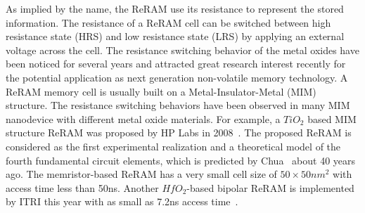 As implied by the name, the ReRAM use its resistance to represent the stored information. The resistance of a ReRAM cell can be switched between high resistance state (HRS) and low resistance state (LRS) by applying an external voltage across the cell. The resistance switching behavior of the metal oxides have been noticed for several years and attracted great research interest recently for the potential application as next generation non-volatile memory technology. A ReRAM memory cell is usually built on a Metal-Insulator-Metal (MIM) structure. The resistance switching behaviors have been observed in many MIM nanodevice with different metal oxide materials. For example, a $TiO_2$ based MIM structure ReRAM was proposed by HP Labs in 2008~\cite{memristor:missing}. The proposed ReRAM is considered as the first experimental realization and a theoretical model of the fourth fundamental circuit elements, which is predicted by Chua~\cite{memristor:chua} about 40 years ago. The memristor-based ReRAM has a very small cell size of $50\times50 nm^2$ with access time less than 50ns. Another $HfO_2$-based bipolar ReRAM is implemented by ITRI this year with as small as 7.2ns access time~\cite{memristor:ISSCC2011_ITRI}.
 

